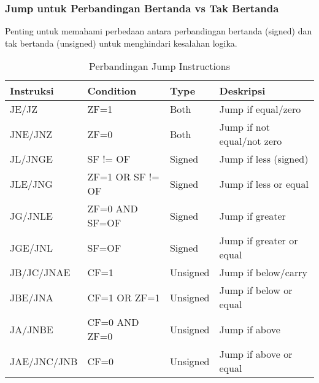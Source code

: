 \documentclass[../main.tex]{subfiles}
\begin{document}
            \subsubsection{Jump untuk Perbandingan Bertanda vs Tak Bertanda}
Penting untuk memahami perbedaan antara perbandingan bertanda (signed) dan tak bertanda (unsigned) untuk menghindari kesalahan logika.

\begin{table}[H]
\centering
\caption{Perbandingan Jump Instructions}
\begin{tabular}{|l|l|l|l|}
\hline
\textbf{Instruksi} & \textbf{Condition} & \textbf{Type} & \textbf{Deskripsi} \\
\hline
JE/JZ & ZF=1 & Both & Jump if equal/zero \\
JNE/JNZ & ZF=0 & Both & Jump if not equal/not zero \\
\hline
JL/JNGE & SF != OF & Signed & Jump if less (signed) \\
JLE/JNG & ZF=1 OR SF != OF & Signed & Jump if less or equal \\
JG/JNLE & ZF=0 AND SF=OF & Signed & Jump if greater \\
JGE/JNL & SF=OF & Signed & Jump if greater or equal \\
\hline
JB/JC/JNAE & CF=1 & Unsigned & Jump if below/carry \\
JBE/JNA & CF=1 OR ZF=1 & Unsigned & Jump if below or equal \\
JA/JNBE & CF=0 AND ZF=0 & Unsigned & Jump if above \\
JAE/JNC/JNB & CF=0 & Unsigned & Jump if above or equal \\
\hline
\end{tabular}
\end{table}
\end{document}
